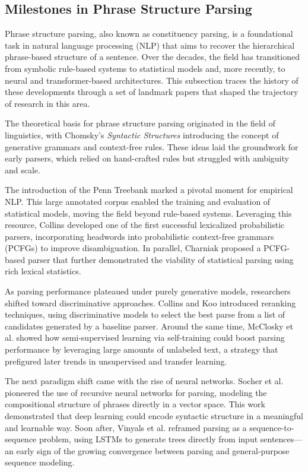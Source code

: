 \subsection{Milestones in Phrase Structure Parsing}

Phrase structure parsing, also known as constituency parsing, is a foundational task in natural language processing (NLP) that aims to recover the hierarchical phrase-based structure of a sentence. Over the decades, the field has transitioned from symbolic rule-based systems to statistical models and, more recently, to neural and transformer-based architectures. This subsection traces the history of these developments through a set of landmark papers that shaped the trajectory of research in this area.

The theoretical basis for phrase structure parsing originated in the field of linguistics, with Chomsky's \textit{Syntactic Structures} \cite{chomsky1957syntactic} introducing the concept of generative grammars and context-free rules. These ideas laid the groundwork for early parsers, which relied on hand-crafted rules but struggled with ambiguity and scale.

The introduction of the Penn Treebank \cite{marcus1993building} marked a pivotal moment for empirical NLP. This large annotated corpus enabled the training and evaluation of statistical models, moving the field beyond rule-based systems. Leveraging this resource, Collins \cite{collins1997three} developed one of the first successful lexicalized probabilistic parsers, incorporating headwords into probabilistic context-free grammars (PCFGs) to improve disambiguation. In parallel, Charniak \cite{charniak1997statistical} proposed a PCFG-based parser that further demonstrated the viability of statistical parsing using rich lexical statistics.

As parsing performance plateaued under purely generative models, researchers shifted toward discriminative approaches. Collins and Koo \cite{collins2005discriminative} introduced reranking techniques, using discriminative models to select the best parse from a list of candidates generated by a baseline parser. Around the same time, McClosky et al. \cite{mcclosky2006effective} showed how semi-supervised learning via self-training could boost parsing performance by leveraging large amounts of unlabeled text, a strategy that prefigured later trends in unsupervised and transfer learning.

The next paradigm shift came with the rise of neural networks. Socher et al. \cite{socher2013parsing} pioneered the use of recursive neural networks for parsing, modeling the compositional structure of phrases directly in a vector space. This work demonstrated that deep learning could encode syntactic structure in a meaningful and learnable way. Soon after, Vinyals et al. \cite{vinyals2015grammar} reframed parsing as a sequence-to-sequence problem, using LSTMs to generate trees directly from input sentences—an early sign of the growing convergence between parsing and general-purpose sequence modeling.

